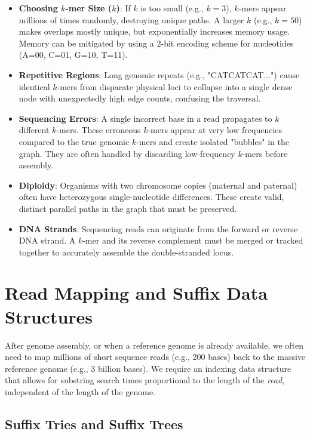 \documentclass{article}
\begin{document}
\begin{itemize}
    \item \textbf{Choosing $k$-mer Size ($k$)}: If $k$ is too small (e.g., $k=3$), $k$-mers appear millions of times randomly, destroying unique paths. A larger $k$ (e.g., $k=50$) makes overlaps mostly unique, but exponentially increases memory usage. Memory can be mitigated by using a 2-bit encoding scheme for nucleotides (A=00, C=01, G=10, T=11).
    \item \textbf{Repetitive Regions}: Long genomic repeats (e.g., "CATCATCAT...") cause identical $k$-mers from disparate physical loci to collapse into a single dense node with unexpectedly high edge counts, confusing the traversal.
    \item \textbf{Sequencing Errors}: A single incorrect base in a read propagates to $k$ different $k$-mers. These erroneous $k$-mers appear at very low frequencies compared to the true genomic $k$-mers and create isolated "bubbles" in the graph. They are often handled by discarding low-frequency $k$-mers before assembly.
    \item \textbf{Diploidy}: Organisms with two chromosome copies (maternal and paternal) often have heterozygous single-nucleotide differences. These create valid, distinct parallel paths in the graph that must be preserved.
    \item \textbf{DNA Strands}: Sequencing reads can originate from the forward or reverse DNA strand. A $k$-mer and its reverse complement must be merged or tracked together to accurately assemble the double-stranded locus.
\end{itemize}

\section{Read Mapping and Suffix Data Structures}

After genome assembly, or when a reference genome is already available, we often need to map millions of short sequence reads (e.g., 200 bases) back to the massive reference genome (e.g., 3 billion bases). We require an indexing data structure that allows for substring search times proportional to the length of the \textit{read}, independent of the length of the genome.

\subsection{Suffix Tries and Suffix Trees}
\end{document}
